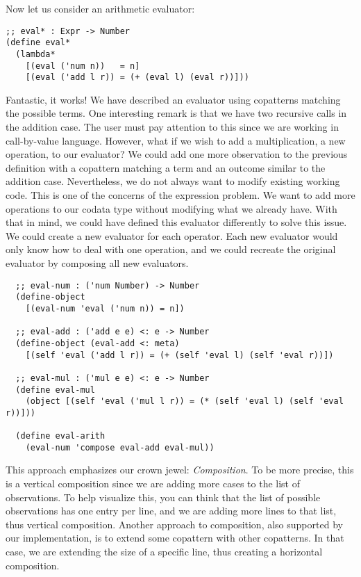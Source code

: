 Now let us consider an arithmetic evaluator:

\begin{verbatim}
;; eval* : Expr -> Number
(define eval*
  (lambda*
    [(eval ('num n))   = n]
    [(eval ('add l r)) = (+ (eval l) (eval r))]))
\end{verbatim}


Fantastic, it works! 
We have described an evaluator using copatterns matching the possible terms.
One interesting remark is that we have two recursive calls in the addition case.
The user must pay attention to this since we are working in call-by-value language.
However, what if we wish to add a multiplication, a new operation, to our evaluator? 
We could add one more observation to the previous definition with a copattern matching a  term and an outcome similar to the addition case.
Nevertheless, we do not always want to modify existing working code.
This is one of the concerns of the expression problem.
We want to add more operations to our codata type without modifying what we already have.
With that in mind, we could have defined this evaluator differently to solve this issue.
We could create a new evaluator for each operator. Each new evaluator would only know how to deal with one operation, and we could recreate the original evaluator by composing all new evaluators.

\begin{verbatim}
  ;; eval-num : ('num Number) -> Number
  (define-object
    [(eval-num 'eval ('num n)) = n])
  
  ;; eval-add : ('add e e) <: e -> Number
  (define-object (eval-add <: meta)
    [(self 'eval ('add l r)) = (+ (self 'eval l) (self 'eval r))])
  
  ;; eval-mul : ('mul e e) <: e -> Number
  (define eval-mul
    (object [(self 'eval ('mul l r)) = (* (self 'eval l) (self 'eval r))]))
  
  (define eval-arith
    (eval-num 'compose eval-add eval-mul))

\end{verbatim}


This approach emphasizes our crown jewel: \emph{Composition}.
To be more precise, this is a vertical composition since we are adding more cases to the list of observations.
To help visualize this, you can think that the list of possible observations has one entry per line, and we are adding more lines to that list, thus vertical composition.
Another approach to composition, also supported by our implementation, is to extend some copattern with other copatterns.
In that case, we are extending the size of a specific line, thus creating a horizontal composition.

